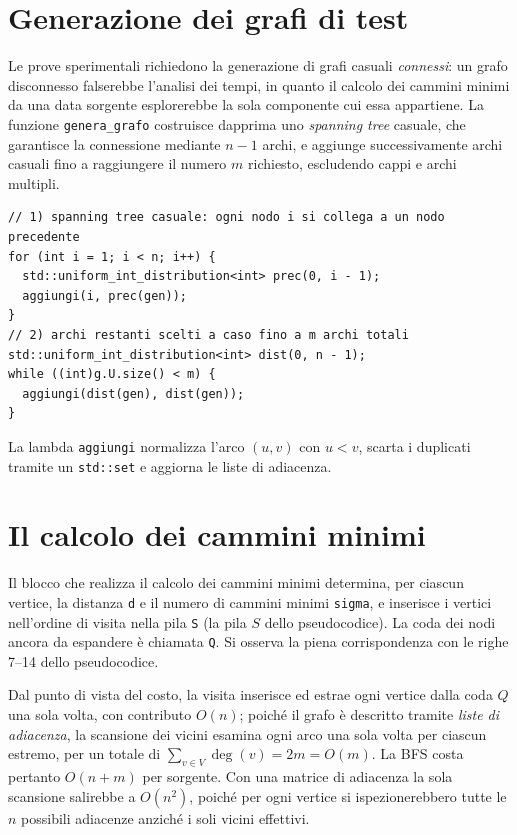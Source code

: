\documentclass[11pt,a4paper]{report}
\begin{document}
\section{Generazione dei grafi di test}

Le prove sperimentali richiedono la generazione di grafi casuali \emph{connessi}:
un grafo disconnesso falserebbe l'analisi dei tempi, in quanto il calcolo dei
cammini minimi da una data sorgente esplorerebbe la sola componente cui essa appartiene.
La funzione \texttt{genera\_grafo} costruisce dapprima uno \emph{spanning tree}
casuale, che garantisce la connessione mediante $n-1$ archi, e aggiunge
successivamente archi casuali fino a raggiungere il numero $m$ richiesto,
escludendo cappi e archi multipli.

\begin{lstlisting}[caption={Generazione di un grafo connesso (estratto).}]
// 1) spanning tree casuale: ogni nodo i si collega a un nodo precedente
for (int i = 1; i < n; i++) {
  std::uniform_int_distribution<int> prec(0, i - 1);
  aggiungi(i, prec(gen));
}
// 2) archi restanti scelti a caso fino a m archi totali
std::uniform_int_distribution<int> dist(0, n - 1);
while ((int)g.U.size() < m) {
  aggiungi(dist(gen), dist(gen));
}
\end{lstlisting}

La lambda \texttt{aggiungi} normalizza l'arco $(u,v)$ con $u<v$, scarta i
duplicati tramite un \texttt{std::set} e aggiorna le liste di adiacenza.

\section{Il calcolo dei cammini minimi}

Il blocco che realizza il calcolo dei cammini minimi determina, per ciascun
vertice, la distanza \texttt{d} e il numero di cammini minimi \texttt{sigma}, e
inserisce i vertici nell'ordine di visita nella pila \texttt{S} (la pila $S$ dello
pseudocodice). La coda dei nodi ancora da espandere è chiamata \texttt{Q}.
Si osserva la piena corrispondenza con le righe 7--14 dello pseudocodice.

Dal punto di vista del costo, la visita inserisce ed estrae ogni vertice dalla coda
$Q$ una sola volta, con contributo $O(n)$; poiché il grafo è descritto tramite
\emph{liste di adiacenza}, la scansione dei vicini esamina ogni arco una sola volta
per ciascun estremo, per un totale di $\sum_{v\in V}\deg(v)=2m=O(m)$. La BFS costa
pertanto $O(n+m)$ per sorgente. Con una matrice di adiacenza la sola scansione
salirebbe a $O(n^2)$, poiché per ogni vertice si ispezionerebbero tutte le $n$
possibili adiacenze anziché i soli vicini effettivi.
\end{document}
